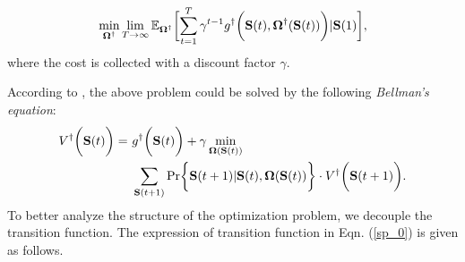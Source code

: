 \begin{problem}
    \begin{align}
        \min_{\Policy^{\dagger}} \lim_{T \to \infty}
            \mathbb{E}_{\Policy^{\dagger}}
                \Bracket{\sum_{t=1}^{T} \gamma^{t-1} g^{\dagger}\Paren{\Stat({t}), \Policy^{\dagger}(\Stat({t}))}|\Stat(1)},
    \end{align}
    where the cost is collected with a discount factor $\gamma$.
\end{problem}
According to \cite{sutton1998introduction}, the above problem could be solved by the following \emph{Bellman's equation}:
\begin{align}
    V^{\dagger}\Paren{\Stat({t})} =~&g^{\dagger}\Paren{\Stat({t})} + \gamma \min_{\Policy(\Stat({t}))}
        \nonumber\\
        &\sum_{\Stat({t+1})} \Pr\Brace{ \Stat({t+1})|\Stat({t}), \Policy(\Stat({t})) } \cdot V^{\dagger}\Paren{\Stat({t+1})}.
    \label{sp_0}
\end{align}
To better analyze the structure of the optimization problem, we decouple the transition function.
The expression of transition function in Eqn. (\ref{sp_0}) is given as follows.
